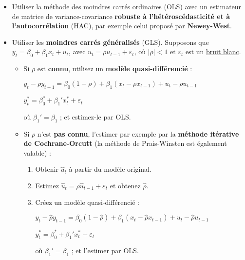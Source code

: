 \begin{f}[Correction]

\begin{itemize}[leftmargin=*]
\item Utiliser la méthode des moindres carrés ordinaires (OLS) avec un estimateur de matrice de variance-covariance \textbf{robuste à l'hétéroscédasticité et à l'autocorrélation} (HAC), par exemple celui proposé par \textbf{Newey-West}.
\item Utiliser les \textbf{moindres carrés généralisés} (GLS). Supposons que \(y_{t} = \beta_{0} + \beta_{1} x_{t} + u_{t}\), avec \(u_{t} = \rho u_{t - 1}+ \varepsilon_{t}\), où \(\lvert \rho \rvert < 1\) et \(\varepsilon_{t}\) est un \underline{bruit blanc}.

\begin{itemize}[leftmargin=*]
\item Si \(\rho\) est \textbf{connu}, utilisez un \textbf{modèle quasi-différencié} :

\begin{center}
	\(y_{t} - \rho y_{t - 1}= \beta_{0} (1 - \rho) + \beta_{1} (x_{t} - \rho x_{t - 1}) + u_{t} - \rho u_{t - 1}\)
	
	\(y_{t}^{*} = \beta_{0}^{*} + \beta_{1}' x_{t}^{*} + \varepsilon_{t}\)
\end{center}

où \(\beta_{1}' = \beta_{1}\) ; et estimez-le par OLS.

\item Si \(\rho\) n'est \textbf{pas connu}, l'estimer par exemple par la \textbf{méthode itérative de Cochrane-Orcutt} (la méthode de Prais-Winsten est également valable) :

\begin{enumerate}[leftmargin=*]
	\item Obtenir \(\hat{u}_{t}\) à partir du modèle original.
	\item Estimez \(\hat{u}_{t} = \rho \hat{u}_{t-1} + \varepsilon_{t}\) et obtenez \(\hat{\rho}\).
	\item Créez un modèle quasi-différencié :
	
	\begin{center}
		\(y_{t} - \hat{\rho}y_{t - 1} = \beta_{0} (1 - \hat{\rho}) + \beta_{1} (x_{t} - \hat{\rho} x_{t - 1}) + u_{t} - \hat{\rho}u_{t - 1}\)
		
		\(y_{t}^{*} = \beta_{0}^{*} + \beta_{1}' x_{t}^{*} + \varepsilon_{t}\)
	\end{center}
	
	où \(\beta_{1}' = \beta_{1}\) ; et l'estimer par OLS.
	

\end{enumerate}
\end{itemize}
\end{itemize}
\end{f}
